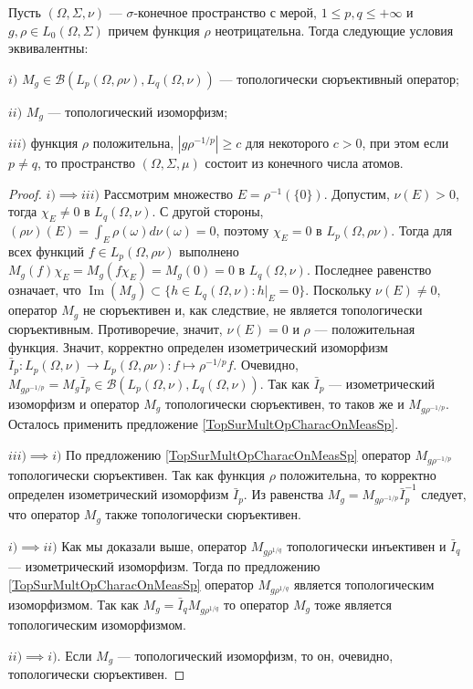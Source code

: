 \begin{proposition}\label{TopSurMultOpCharacBtwnTwoContMeasSp} Пусть $(\Omega,\Sigma,\nu)$ --- $\sigma$-конечное пространство с мерой, $1\leq p,q\leq +\infty$ и $g,\rho\in L_0(\Omega,\Sigma)$ причем функция $\rho$  неотрицательна. Тогда следующие условия эквивалентны:

$i)$ $M_g\in\mathcal{B}(L_p(\Omega,\rho \nu),L_q(\Omega,\nu))$ --- топологически сюръективный оператор;

$ii)$ $M_g$ --- топологический изоморфизм;

$iii)$ функция $\rho$ положительна, $|g  \rho^{-1/p}|\geq c$ для некоторого $c>0$, при этом если $p\neq q$, то пространство $(\Omega,\Sigma,\mu)$ состоит из конечного числа атомов.
\end{proposition}
\begin{proof} $i)$$\implies$$ iii)$ Рассмотрим множество $E=\rho^{-1}(\{0\})$. Допустим, $\nu(E)>0$, тогда $\chi_E\neq 0$ в $L_q(\Omega,\nu)$. С другой стороны, $(\rho \nu)(E)=\int_E\rho(\omega)d\nu(\omega)=0$, поэтому $\chi_E=0$ в $L_p(\Omega,\rho \nu)$. Тогда для всех функций $f\in L_p(\Omega,\rho \nu)$ выполнено $M_g(f)\chi_E=M_g(f \chi_E)=M_g(0)=0$ в $L_q(\Omega,\nu)$. Последнее равенство означает, что $\operatorname{Im}(M_g)\subset\{h\in L_q(\Omega,\nu): h|_E=0\}$. Поскольку $\nu(E)\neq 0$, оператор $M_g$ не сюръективен и, как следствие, не является топологически сюръективным. Противоречие, значит, $\nu(E)=0$ и $\rho$ --- положительная функция. Значит, корректно определен изометрический изоморфизм $\bar{I}_p:L_p(\Omega,\nu)\to L_p(\Omega,\rho \nu):f\mapsto \rho^{-1/p}  f$. Очевидно, $M_{g \rho^{-1/p}}=M_g \bar{I}_p\in\mathcal{B}(L_p(\Omega,\nu),L_q(\Omega,\nu))$. Так как $\bar{I}_p$ --- изометрический изоморфизм и оператор $M_g$ топологически сюръективен, то таков же и $M_{g  \rho^{-1/p}}$. Осталось применить предложение \ref{TopSurMultOpCharacOnMeasSp}.

$iii)$$\implies$$ i)$ По предложению \ref{TopSurMultOpCharacOnMeasSp} оператор $M_{g \rho^{-1/p}}$ топологически сюръективен. Так как функция $\rho$ положительна, то корректно определен изометрический изоморфизм $\bar{I}_p$. Из равенства $M_g= M_{g \rho^{-1/p}}\bar{I}_p^{-1}$ следует, что оператор $M_g$ также топологически сюръективен.

$i)$$\implies$$ ii)$ Как мы доказали выше, оператор $M_{g \rho^{1/q}}$ топологически инъективен и $\bar{I}_q$ --- изометрический изоморфизм. Тогда по предложению \ref{TopSurMultOpCharacOnMeasSp} оператор $M_{g \rho^{1/q}}$ является топологическим изоморфизмом. Так как $M_g=\bar{I}_q M_{g \rho^{1/q}}$ то оператор $M_g$ тоже является топологическим изоморфизмом.

$ii)$$\implies$$ i)$. Если $M_g$ --- топологический изоморфизм, то он, очевидно, топологически сюръективен.
\end{proof}

